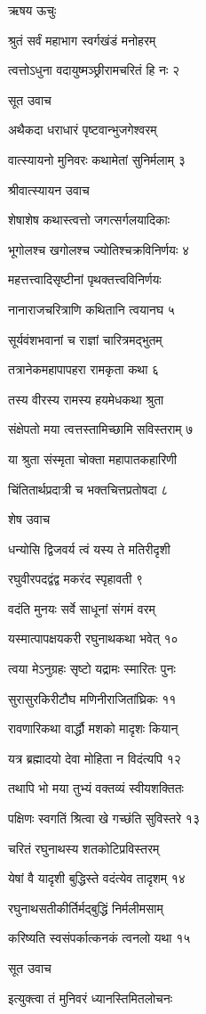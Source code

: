 ऋषय ऊचुः

श्रुतं सर्वं महाभाग स्वर्गखंडं मनोहरम्

त्वत्तोऽधुना वदायुष्मञ्छ्रीरामचरितं हि नः २

सूत उवाच

अथैकदा धराधारं पृष्टवान्भुजगेश्वरम्

वात्स्यायनो मुनिवरः कथामेतां सुनिर्मलाम् ३

श्रीवात्स्यायन उवाच

शेषाशेष कथास्त्वत्तो जगत्सर्गलयादिकाः

भूगोलश्च खगोलश्च ज्योतिश्चक्रविनिर्णयः ४

महत्तत्त्वादिसृष्टीनां पृथक्तत्त्वविनिर्णयः

नानाराजचरित्राणि कथितानि त्वयानघ ५

सूर्यवंशभवानां च राज्ञां चारित्रमद्भुतम्

तत्रानेकमहापापहरा रामकृता कथा ६

तस्य वीरस्य रामस्य हयमेधकथा श्रुता

संक्षेपतो मया त्वत्तस्तामिच्छामि सविस्तराम् ७

या श्रुता संस्मृता चोक्ता महापातकहारिणी

चिंतितार्थप्रदात्री च भक्तचित्तप्रतोषदा ८

शेष उवाच

धन्योसि द्विजवर्य त्वं यस्य ते मतिरीदृशी

रघुवीरपदद्वंद्व मकरंद स्पृहावती ९

वदंति मुनयः सर्वे साधूनां संगमं वरम्

यस्मात्पापक्षयकरी रघुनाथकथा भवेत् १०

त्वया मेऽनुग्रहः सृष्टो यद्रामः स्मारितः पुनः

सुरासुरकिरीटौघ मणिनीराजितांघ्रिकः ११

रावणारिकथा वार्द्धौ मशको मादृशः कियान्

यत्र ब्रह्मादयो देवा मोहिता न विदंत्यपि १२

तथापि भो मया तुभ्यं वक्तव्यं स्वीयशक्तितः

पक्षिणः स्वगतिं श्रित्वा खे गच्छंति सुविस्तरे १३

चरितं रघुनाथस्य शतकोटिप्रविस्तरम्

येषां वै यादृशी बुद्धिस्ते वदंत्येव तादृशम् १४

रघुनाथसतीकीर्तिर्मद्बुद्धिं निर्मलीमसाम्

करिष्यति स्वसंपर्कात्कनकं त्वनलो यथा १५

सूत उवाच

इत्युक्त्वा तं मुनिवरं ध्यानस्तिमितलोचनः

